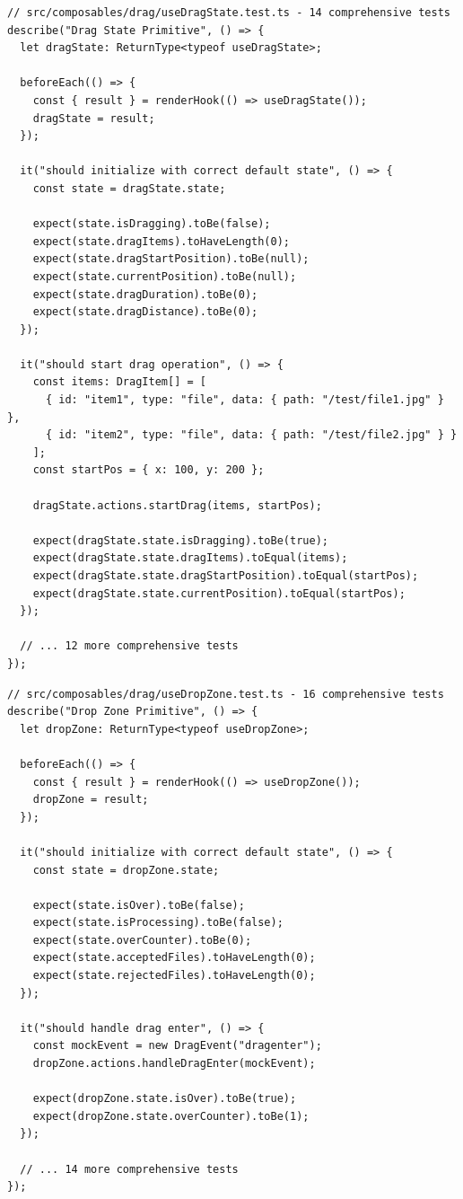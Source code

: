 \documentclass[11pt]{article}
\begin{document}
\begin{lstlisting}[style=typescript]
// src/composables/drag/useDragState.test.ts - 14 comprehensive tests
describe("Drag State Primitive", () => {
  let dragState: ReturnType<typeof useDragState>;

  beforeEach(() => {
    const { result } = renderHook(() => useDragState());
    dragState = result;
  });

  it("should initialize with correct default state", () => {
    const state = dragState.state;
    
    expect(state.isDragging).toBe(false);
    expect(state.dragItems).toHaveLength(0);
    expect(state.dragStartPosition).toBe(null);
    expect(state.currentPosition).toBe(null);
    expect(state.dragDuration).toBe(0);
    expect(state.dragDistance).toBe(0);
  });

  it("should start drag operation", () => {
    const items: DragItem[] = [
      { id: "item1", type: "file", data: { path: "/test/file1.jpg" } },
      { id: "item2", type: "file", data: { path: "/test/file2.jpg" } }
    ];
    const startPos = { x: 100, y: 200 };

    dragState.actions.startDrag(items, startPos);
    
    expect(dragState.state.isDragging).toBe(true);
    expect(dragState.state.dragItems).toEqual(items);
    expect(dragState.state.dragStartPosition).toEqual(startPos);
    expect(dragState.state.currentPosition).toEqual(startPos);
  });

  // ... 12 more comprehensive tests
});
\end{lstlisting}

\begin{lstlisting}[style=typescript]
// src/composables/drag/useDropZone.test.ts - 16 comprehensive tests
describe("Drop Zone Primitive", () => {
  let dropZone: ReturnType<typeof useDropZone>;

  beforeEach(() => {
    const { result } = renderHook(() => useDropZone());
    dropZone = result;
  });

  it("should initialize with correct default state", () => {
    const state = dropZone.state;
    
    expect(state.isOver).toBe(false);
    expect(state.isProcessing).toBe(false);
    expect(state.overCounter).toBe(0);
    expect(state.acceptedFiles).toHaveLength(0);
    expect(state.rejectedFiles).toHaveLength(0);
  });

  it("should handle drag enter", () => {
    const mockEvent = new DragEvent("dragenter");
    dropZone.actions.handleDragEnter(mockEvent);
    
    expect(dropZone.state.isOver).toBe(true);
    expect(dropZone.state.overCounter).toBe(1);
  });

  // ... 14 more comprehensive tests
});
\end{lstlisting}
\end{document}

